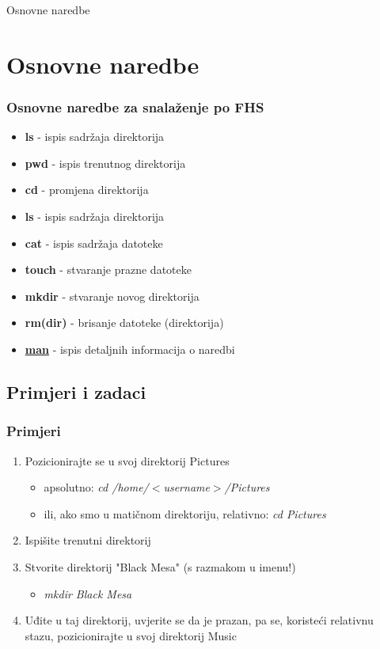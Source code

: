 \documentclass{beamer}
\begin{document}
\begin{frame}[c]
  \begin{center}
    \begin{Huge}
      Osnovne naredbe
    \end{Huge}
  \end{center}
\end{frame}

\section{Osnovne naredbe}
\begin{frame}[t]
\frametitle{Osnovne naredbe za snalaženje po FHS}
  \begin{itemize}
    \item \textbf{ls} - ispis sadržaja direktorija
    \item \textbf{pwd} - ispis trenutnog direktorija
    \item \textbf{cd} - promjena direktorija
    \item \textbf{ls} - ispis sadržaja direktorija
    \item \textbf{cat} - ispis sadržaja datoteke
    \item \textbf{touch} - stvaranje prazne datoteke
    \item \textbf{mkdir} - stvaranje novog direktorija
    \item \textbf{rm(dir)} - brisanje datoteke (direktorija)
    \vfill
    \item \textbf{\underline{man}} - ispis detaljnih informacija o naredbi
  \end{itemize}
\end{frame}


\subsection{Primjeri i zadaci}

\begin{frame}[t]
\frametitle{Primjeri}
  \begin{enumerate}
    \item Pozicionirajte se u svoj direktorij Pictures
    \begin{itemize}
      \item apsolutno: \textit{cd /home/$<$username$>$/Pictures}
      \item ili, ako smo u matičnom direktoriju, relativno: \textit{cd Pictures}
    \end{itemize}
    \item Ispišite trenutni direktorij
    \item Stvorite direktorij "Black Mesa" (s razmakom u imenu!)
    \begin{itemize}
      \item \textit{mkdir Black Mesa}
    \end{itemize}
    \item Uđite u taj direktorij, uvjerite se da je prazan, pa se, koristeći relativnu stazu, pozicionirajte u svoj direktorij Music
  \end{enumerate}
\end{frame}
\end{document}
